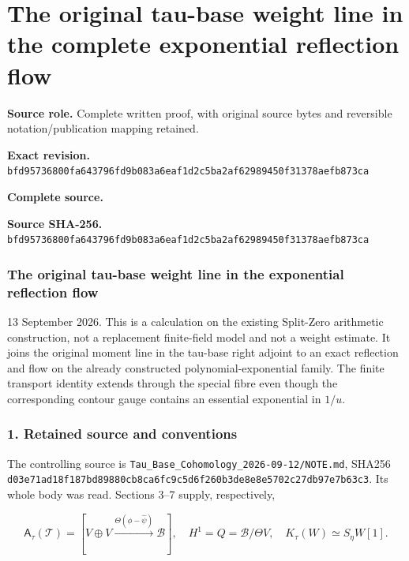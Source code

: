 \begingroup

\section{The original tau-base weight line in the complete exponential reflection flow}


\begingroup
\sloppy
\small

\noindent\textbf{Source role.} Complete written proof, with original source bytes and reversible notation/publication mapping retained.\par
\noindent\textbf{Exact revision.} \nolinkurl{bfd95736800fa643796fd9b083a6eaf1d2c5ba2af62989450f31378aefb873ca}\par
\noindent\textbf{Complete source.} \par
\noindent\textbf{Source SHA-256.} \nolinkurl{bfd95736800fa643796fd9b083a6eaf1d2c5ba2af62989450f31378aefb873ca}\par\medskip
\subsubsection{The original tau-base weight line in the exponential reflection flow}\label{endpoint-f1_reflection--the-original-tau-base-weight-line-in-the-exponential-reflection-flow}

13 September 2026. This is a calculation on the existing Split-Zero arithmetic construction, not a replacement finite-field model and not a weight estimate. It joins the original moment line in the tau-base right adjoint to an exact reflection and flow on the already constructed polynomial-exponential family. The finite transport identity extends through the special fibre even though the corresponding contour gauge contains an essential exponential in \(1/u\).

\subsubsection{1. Retained source and conventions}\label{endpoint-f1_reflection--retained-source-and-conventions}

The controlling source is \nolinkurl{Tau_Base_Cohomology_2026-09-12/NOTE.md}, SHA256 \nolinkurl{d03e71ad18f187bd89880cb8ca6fc9c5d6f260b3de8e8e5702c27db97e7b63c3}. Its whole body was read. Sections 3--7 supply, respectively,

\[
\mathsf A_\tau(\mathcal T)
=[V\oplus V\xrightarrow{\Theta(\phi-\widehat\psi)}\mathscr B],
\quad H^1=Q=\mathscr B/\Theta V,
\quad K_\tau(W)\simeq S_\eta W[1].
\tag{RW1}
\]

